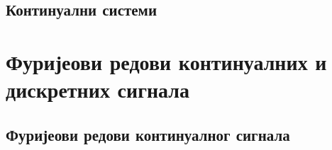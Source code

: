 \setcounter{fid}{0}
\graphicspath{{./1_uvod/1_osnovne_osobine_signala/}}
\noindent

\vspace*{\ProblemSep}
\subsection{Континуални системи
}

\setcounter{fid}{0}
\graphicspath{{./1_uvod/2_kontinualni_sistemi/}}
\noindent

\vspace*{\ProblemSep}

\setcounter{fid}{0}
\graphicspath{{./1_uvod/2_kontinualni_sistemi/}}
\noindent

\vspace*{\ProblemSep}

\setcounter{fid}{0}
\graphicspath{{./1_uvod/2_kontinualni_sistemi/}}
\noindent

\vspace*{\ProblemSep}

\setcounter{fid}{0}
\graphicspath{{./1_uvod/2_kontinualni_sistemi/}}
\noindent

\vspace*{\ProblemSep}

\setcounter{fid}{0}
\graphicspath{{./1_uvod/2_kontinualni_sistemi/}}
\noindent

\vspace*{\ProblemSep}
\section{Фуријеови редови континуалних и дискретних сигнала}
\subsection{Фуријеови редови континуалног сигнала}

\setcounter{fid}{0}
\graphicspath{{./2_furijeovi_redovi/1_kontinualni/}}
\noindent

\vspace*{\ProblemSep}

\setcounter{fid}{0}
\graphicspath{{./2_furijeovi_redovi/1_kontinualni/}}
\noindent

\vspace*{\ProblemSep}

